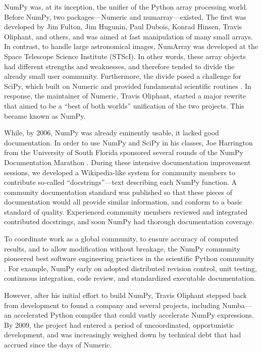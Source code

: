 \documentclass[fleqn,10pt]{wlscirep}
\begin{document}
NumPy was, at its inception, the unifier of the Python array
processing world.  Before NumPy, two packages—Numeric and
numarray—existed.  The first was developed by Jim Fulton, Jim Hugunin, Paul Dubois, Konrad
Hinsen, Travis Oliphant, and others, and was aimed at fast manipulation of many
small arrays.  In contrast, to handle large astronomical images,
NumArray was developed at the Space Telescope Science Institute (STScI).
In other words, these array
objects had different strengths and weaknesses, and therefore tended
to divide the already small user community.  Furthermore, the divide
posed a challenge for SciPy, which built on Numeric and provided
fundamental scientific routines \cite{virtanen2019scipy}.
In response, the maintainer of Numeric, Travis Oliphant, started a
major rewrite that aimed to be a ``best of both worlds'' unification
of the two projects.  This became known as NumPy.

While, by 2006, NumPy was already eminently usable, it lacked good
documentation. In order to use NumPy and SciPy in his classes, Joe Harrington
from the University of South Florida sponsored several rounds of the
NumPy Documentation Marathon \cite{harrington2008scipy,vanderwalt2008scipy}.
During these intensive
documentation improvement sessions, we developed a Wikipedia-like
system for community members to contribute so-called
``docstrings''—text describing each NumPy function. A community
documentation standard was published so that these pieces of
documentation would all provide similar information, and conform to a
basic standard of quality. Experienced community members reviewed and
integrated contributed docstrings, and soon NumPy had thorough
documentation coverage.

To coordinate work as a global community, to ensure accuracy of computed
results, and to allow modification without breakage, the NumPy community
pioneered best software engineering practices in the scientific Python
community  \cite{millman2014developing}.
For example, NumPy early on adopted distributed revision control, unit testing,
continuous integration, code review, and standardized executable documentation.

However, after his initial effort to build NumPy, Travis Oliphant
stepped back from development to found a company and several projects,
including Numba---an accelerated Python compiler that could vastly
accelerate NumPy expressions.  By 2009, the project had entered a
period of uncoordinated, opportunistic development, and was
increasingly weighed down by technical debt that had accrued since the
days of Numeric.
\end{document}
